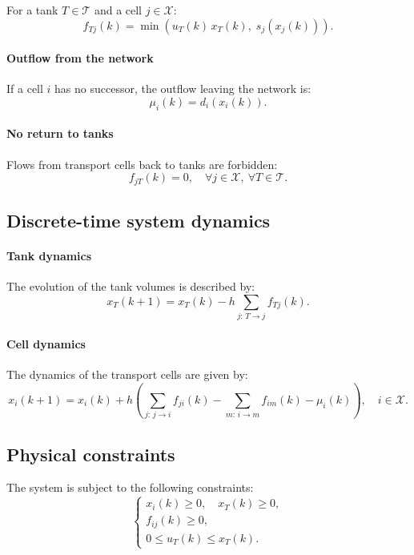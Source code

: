 \documentclass[12pt]{article}
\begin{document}
For a tank $T \in \mathcal{T}$ and a cell $j \in \mathcal{X}$:
\[
f_{Tj}(k) = \min\left(u_T(k)\, x_T(k),\; s_j(x_j(k))\right).
\]

\paragraph{Outflow from the network}

If a cell $i$ has no successor, the outflow leaving the network is:
\[
\mu_i(k) = d_i(x_i(k)).
\]

\paragraph{No return to tanks}

Flows from transport cells back to tanks are forbidden:
\[
f_{jT}(k) = 0, \quad \forall j \in \mathcal{X},\ \forall T \in \mathcal{T}.
\]

\subsection{Discrete-time system dynamics}

\paragraph{Tank dynamics}

The evolution of the tank volumes is described by:
\[
x_T(k+1) = x_T(k) - h \sum_{j:\,T \to j} f_{Tj}(k).
\]

\paragraph{Cell dynamics}

The dynamics of the transport cells are given by:
\[
x_i(k+1) = x_i(k)
+ h \left(
\sum_{j:\,j \to i} f_{ji}(k)
- \sum_{m:\,i \to m} f_{im}(k)
- \mu_i(k)
\right),
\quad i \in \mathcal{X}.
\]

\subsection{Physical constraints}

The system is subject to the following constraints:
\[
\begin{cases}
x_i(k) \ge 0, \quad x_T(k) \ge 0, \\
f_{ij}(k) \ge 0, \\
0 \le u_T(k) \le x_T(k).
\end{cases}
\]
\end{document}
